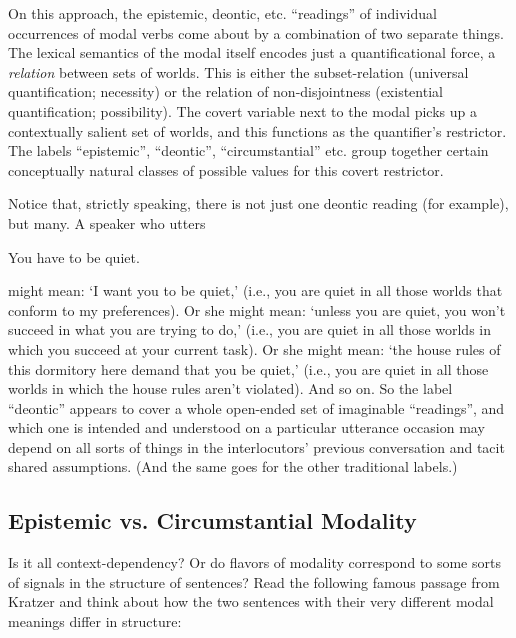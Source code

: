 On this approach, the epistemic, deontic, etc. ``readings'' of
individual occurrences of modal verbs come about by a combination of
two separate things. The lexical semantics of the modal itself encodes
just a quantificational force, a \emph{relation} between sets of
worlds. This is either the subset-relation (universal quantification;
necessity) or the relation of non-disjointness (existential
quantification; possibility). The covert variable next to the modal
picks up a contextually salient set of worlds, and this functions as
the quantifier's restrictor. The labels ``epistemic'', ``deontic'',
``circumstantial'' etc. group together certain conceptually natural
classes of possible values for this covert restrictor.

Notice that, strictly speaking, there is not just one deontic reading
(for example), but many. A speaker who utters

\ex You have to be quiet. \xe

might mean: `I want you to be quiet,' (i.e., you are quiet in all
those worlds that conform to my preferences). Or she might mean:
`unless you are quiet, you won't succeed in what you are trying to
do,' (i.e., you are quiet in all those worlds in which you succeed at
your current task). Or she might mean: `the house rules of this
dormitory here demand that you be quiet,' (i.e., you are quiet in all
those worlds in which the house rules aren't violated). And so on. So
the label ``deontic'' appears to cover a whole open-ended set of
imaginable ``readings'', and which one is intended and understood on a
particular utterance occasion may depend on all sorts of things in the
interlocutors' previous conversation and tacit shared assumptions.
(And the same goes for the other traditional labels.)

\subsection{Epistemic vs. Circumstantial Modality}

Is it all context-dependency? Or do flavors of modality correspond to
some sorts of signals in the structure of sentences? Read the
following famous passage from Kratzer and think about how the two
sentences with their very different modal meanings differ in
structure:

